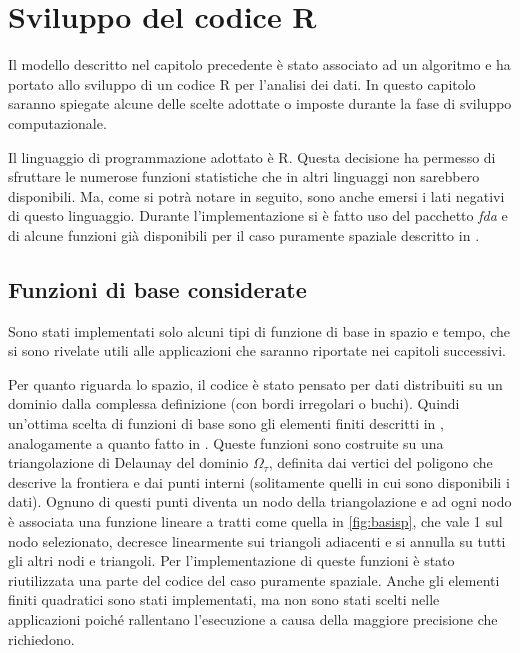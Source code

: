\documentclass[a4paper,11pt,twoside,openright]{book}							%
\begin{document}
\chapter{Sviluppo del codice R}
\label{cap:Codice}
Il modello descritto nel capitolo precedente è stato associato ad un algoritmo e ha portato allo sviluppo di un codice R per l'analisi dei dati. In questo capitolo saranno spiegate alcune delle scelte adottate o imposte durante la fase di sviluppo computazionale.

Il linguaggio di programmazione adottato è R. Questa decisione ha permesso di sfruttare le numerose funzioni statistiche che in altri linguaggi non sarebbero disponibili. Ma, come si potrà notare in seguito, sono anche emersi i lati negativi di questo linguaggio. Durante l'implementazione si è fatto uso del pacchetto \textit{fda} e di alcune funzioni già disponibili per il caso puramente spaziale descritto in \cite{art:sangalli}.

\section{Funzioni di base considerate}
Sono stati implementati solo alcuni tipi di funzione di base in spazio e tempo, che si sono rivelate utili alle applicazioni che saranno riportate nei capitoli successivi. 

Per quanto riguarda lo spazio, il codice è stato pensato per dati distribuiti su un dominio dalla complessa definizione (con bordi irregolari o buchi). Quindi un'ottima scelta di funzioni di base sono gli elementi finiti descritti in \cite{art:quarteroni}, analogamente a quanto fatto in \cite{art:sangalli}. Queste funzioni sono costruite su una triangolazione di Delaunay del dominio $\Omega_{\tau}$, definita dai vertici del poligono che descrive la frontiera e dai punti interni (solitamente quelli in cui sono disponibili i dati). Ognuno di questi punti diventa un nodo della triangolazione e ad ogni nodo è associata una funzione lineare a tratti come quella in \ref{fig:basisp}, che vale 1 sul nodo selezionato, decresce linearmente sui triangoli adiacenti e si annulla su tutti gli altri nodi e triangoli. Per l'implementazione di queste funzioni è stato riutilizzata una parte del codice del caso puramente spaziale. Anche gli elementi finiti quadratici sono stati implementati, ma non sono stati scelti nelle applicazioni poiché rallentano l'esecuzione a causa della maggiore precisione che richiedono.
\end{document}
